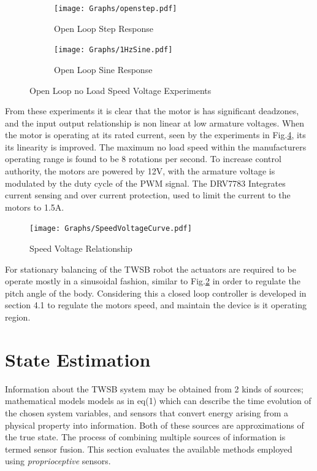         \begin{figure}[H]
            \centering
            \begin{subfigure}[b]{0.45\textwidth}
            \texttt{[image: Graphs/openstep.pdf]}
            \caption{Open Loop Step Response}
            \label{fig:openstep}
            \end{subfigure}
            \hfill
            \begin{subfigure}[b]{0.45\textwidth}
            \texttt{[image: Graphs/1HzSine.pdf]}
            \caption{Open Loop Sine Response}
            \label{fig:opensine}
            \end{subfigure}
            \caption{Open Loop no Load Speed Voltage Experiments}
            \label{fig:openloop}
        \end{figure}


        From these experiments it is clear that the motor is has significant deadzones, 
        and the input output relationship is non linear at low armature voltages. When the motor is operating at 
        its rated current, seen by the experiments in Fig.\ref{fig:speedvolt}, its its linearity is improved. 
        The maximum no load speed within the manufacturers operating range is found to be 8 rotations per second.
        To increase control authority, the motors are powered by 12V, with the armature voltage is modulated by 
        the duty cycle of the PWM signal. The DRV7783 Integrates current sensing and over current protection,
        used to limit the current to the motors to 1.5A.
        \begin{figure}[H]
            \centering
            \texttt{[image: Graphs/SpeedVoltageCurve.pdf]}
            \caption{Speed Voltage Relationship}
            \label{fig:speedvolt}
        \end{figure}
        For stationary balancing of the TWSB robot
        the actuators are required to be operate mostly in a sinusoidal fashion, 
        similar to Fig.\ref{fig:opensine} in order to regulate the pitch angle of the body.
        Considering this a closed loop controller is developed in section 4.1 to regulate the motors speed,
        and maintain the device is it operating region. 

    \section{State Estimation}
    Information about the TWSB system may be obtained from 2 kinds of sources; 
    mathematical models models as in eq(1) which can describe the time evolution of the chosen system variables, 
    and sensors that convert energy arising from a physical property into information. Both of these sources 
    are approximations of the true state. The process of combining multiple sources of information is termed sensor fusion.
    This section evaluates the available methods employed using \textit{proprioceptive} sensors.
